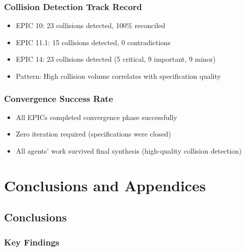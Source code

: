 \documentclass[12pt,oneside,a4paper]{book}
\theoremstyle{definition}
\begin{document}
\section{Collision Detection Track Record}
\label{sec:collision-track-record}

\begin{itemize}
  \item EPIC 10: 23 collisions detected, 100\% reconciled
  \item EPIC 11.1: 15 collisions detected, 0 contradictions
  \item EPIC 14: 23 collisions detected (5 critical, 9 important, 9 minor)
  \item Pattern: High collision volume correlates with specification quality
\end{itemize}

\section{Convergence Success Rate}
\label{sec:convergence-success}

\begin{itemize}
  \item All EPICs completed convergence phase successfully
  \item Zero iteration required (specifications were closed)
  \item All agents' work survived final synthesis (high-quality collision detection)
\end{itemize}


\part{Conclusions and Appendices}
\label{part:conclusions}

\chapter{Conclusions}
\label{ch:conclusions}

\section{Key Findings}
\label{sec:conclusions-findings}
\end{document}
